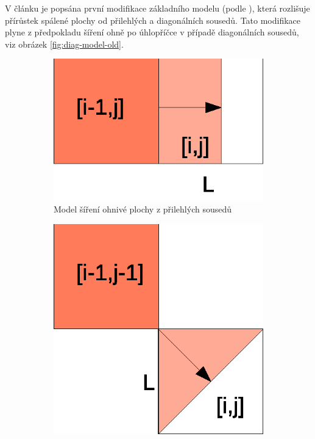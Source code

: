 \documentclass[11pt,a4paper]{scrartcl}
\begin{document}
	V článku je popsána první modifikace základního modelu (podle \cite{old_model_art}), která rozlišuje přírůstek spálené plochy od přilehlých a diagonálních sousedů. Tato modifikace plyne z předpokladu šíření ohně po úhlopříčce v případě diagonálních sousedů, viz obrázek \ref{fig:diag-model-old}.
	
	\begin{figure}[H]
		\centering
		\begin{subfigure}{0.3 \textwidth}
			\includegraphics[width=\linewidth]{model-adj-spread}
			\caption{Model šíření ohnivé plochy z přilehlých sousedů}
			\label{fig:adj-model}
		\end{subfigure}
		\begin{subfigure}{0.3 \textwidth}
			\includegraphics[width=\linewidth]{old-model-diag-spread}

\end{subfigure}
\end{figure}
\end{document}

